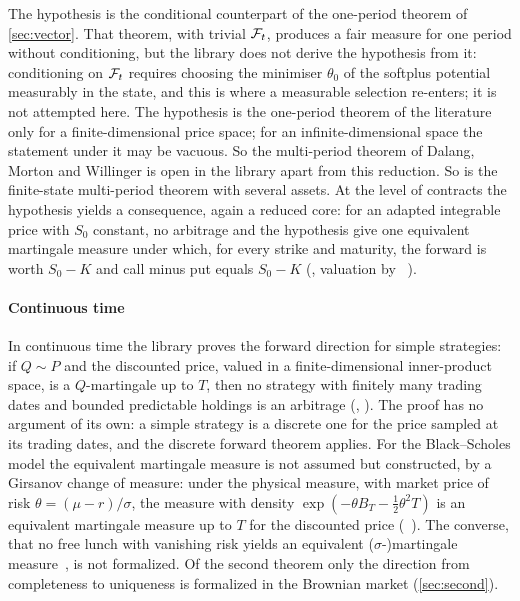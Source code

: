 \documentclass[11pt]{article}
\begin{document}
The hypothesis is the conditional counterpart of the one-period theorem of \cref{sec:vector}. That theorem, with trivial $\mathcal{F}_t$, produces a fair
measure for one period without conditioning, but the library does not derive the hypothesis from it: conditioning on $\mathcal{F}_t$ requires choosing
the minimiser $\theta_0$ of the softplus potential measurably in the state, and this is where a measurable selection re-enters; it is not attempted
here. The hypothesis is the one-period theorem of the literature only for a finite-dimensional price space; for an infinite-dimensional space the
statement under it may be vacuous. So the multi-period theorem of Dalang, Morton and Willinger is open in the library apart from this reduction. So is
the finite-state multi-period theorem with several assets. At the level of contracts the hypothesis yields a consequence, again a reduced core: for
an adapted integrable price with $S_0$ constant, no arbitrage and the hypothesis give one equivalent martingale measure under which, for every
strike and maturity, the forward is worth $S_0-K$ and call minus put equals $S_0-K$
(, valuation by ~\cite{CoelhoLibrary}).

\paragraph{Continuous time}
In continuous time the library proves the forward direction for simple strategies: if $Q\sim P$ and the
discounted price, valued in a finite-dimensional inner-product space, is a $Q$-martingale up to $T$, then no strategy with finitely many trading dates and bounded
predictable holdings is an arbitrage (, ). The proof has no argument of
its own: a simple strategy is a discrete one for the price sampled at its trading dates, and the discrete forward theorem applies.
For the Black--Scholes model the equivalent martingale measure is not assumed but constructed, by a
Girsanov change of measure: under the physical measure, with market price of risk $\theta=(\mu-r)/\sigma$, the measure with density $\exp(-\theta B_T-\tfrac12\theta^2T)$ is an
equivalent martingale measure up to $T$ for the discounted price (~\cite{CoelhoLibrary,CoelhoIto}).
The converse, that no free lunch with
vanishing risk yields an equivalent ($\sigma$-)martingale measure~\cite{DelbaenSchachermayer1994}, is not
formalized. Of the second theorem only the direction from completeness to uniqueness is formalized in the Brownian market (\cref{sec:second}).
\end{document}
